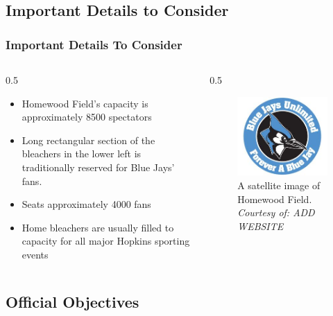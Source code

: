 \documentclass[compress,handout,10pt]{beamer}
\let\olditem\item
\renewcommand{\item}{\setlength{\itemsep}{0.5\baselineskip}\olditem}
\begin{document}
\subsection{Important Details to Consider}

\begin{frame}
	\frametitle {Important Details To Consider}
		\begin {columns}
			\begin {column}{0.5\textwidth}
				\begin{itemize}
					\item Homewood Field's capacity is approximately 8500 spectators
					\item Long rectangular section of the bleachers in the lower left is traditionally reserved for Blue Jays' fans.
						\item Seats approximately 4000 fans
					\item Home bleachers are usually filled to capacity for all major Hopkins sporting events
				\end {itemize}
			\end {column}
			\begin {column}{0.5\textwidth}
			\begin {figure}
				\begin{center}
    			\includegraphics [width=2in] {BJU.jpg}
    			\caption {{\tiny A satellite image of Homewood Field. \textit{Courtesy of: ADD WEBSITE}}}
    		\end{center}
    	\end{figure}	
			\end {column}
		\end {columns}
\end{frame}

\subsection{Official Objectives}
\end{document}
